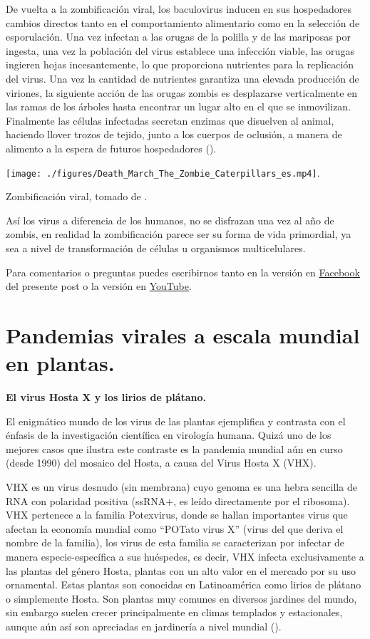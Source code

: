 \documentclass[
  12pt, krantz2,
  spanish,
]{krantz}
\begin{document}
De vuelta a la zombificación viral, los baculovirus inducen en sus hospedadores cambios directos tanto en el comportamiento alimentario como en la selección de esporulación. Una vez infectan a las orugas de la polilla y de las mariposas por ingesta, una vez la población del virus establece una infección viable, las orugas ingieren hojas incesantemente, lo que proporciona nutrientes para la replicación del virus. Una vez la cantidad de nutrientes garantiza una elevada producción de viriones, la siguiente acción de las orugas zombis es desplazarse verticalmente en las ramas de los árboles hasta encontrar un lugar alto en el que se inmovilizan. Finalmente las células infectadas secretan enzimas que disuelven al animal, haciendo llover trozos de tejido, junto a los cuerpos de oclusión, a manera de alimento a la espera de futuros hospedadores (\citet{williams2017covert}).

\texttt{[image: ./figures/Death\_March\_The\_Zombie\_Caterpillars\_es.mp4]}.

Zombificación viral, tomado de \citet{youtube}.

Así los virus a diferencia de los humanos, no se disfrazan una vez al año de zombis, en realidad la zombificación parece ser su forma de vida primordial, ya sea a nivel de transformación de células u organismos multicelulares.

Para comentarios o preguntas puedes escribirnos tanto en la versión en \href{https://www.facebook.com/BioViral/posts/284936346967015}{Facebook} del presente post o la versión en \href{https://www.youtube.com/watch?v=Taqv4eFDtpo}{YouTube}.

\hypertarget{plantPand}{%
\section{Pandemias virales a escala mundial en plantas.}\label{plantPand}}

\textbf{El virus Hosta X y los lirios de plátano.}

El enigmático mundo de los virus de las plantas ejemplifica y contrasta con el énfasis de la investigación científica en virología humana. Quizá uno de los mejores casos que ilustra este contraste es la pandemia mundial aún en curso (desde 1990) del mosaico del Hosta, a causa del Virus Hosta X (VHX).

VHX es un virus desnudo (sin membrana) cuyo genoma es una hebra sencilla de RNA con polaridad positiva (ssRNA+, es leído directamente por el ribosoma). VHX pertenece a la familia Potexvirus, donde se hallan importantes virus que afectan la economía mundial como ``POTato virus X'' (virus del que deriva el nombre de la familia), los virus de esta familia se caracterizan por infectar de manera especie-específica a sus huéspedes, es decir, VHX infecta exclusivamente a las plantas del género Hosta, plantas con un alto valor en el mercado por su uso ornamental. Estas plantas son conocidas en Latinoamérica como lirios de plátano o simplemente Hosta. Son plantas muy comunes en diversos jardines del mundo, sin embargo suelen crecer principalmente en climas templados y estacionales, aunque aún así son apreciadas en jardinería a nivel mundial (\citet{baker2013hosta}).
\end{document}
